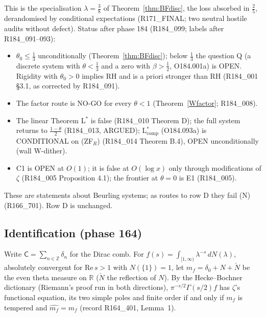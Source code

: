 \documentclass[11pt]{amsart}
\theoremstyle{definition}
\theoremstyle{remark}
\newcommand{\Rel}{\mathrm{Re}\,}
\begin{document}
\noindent This is the specialisation $\lambda=\frac38$ of Theorem~\ref{thm:BFdisc}, the loss absorbed in $\frac25$, derandomised by
conditional expectations (R171\_FINAL; two neutral hostile audits without defect). Status after phase 184 (R184\_099; labels after
R184\_091--093):
\begin{itemize}
\item $\theta_0\le\frac13$ unconditionally (Theorem~\ref{thm:BFdisc}); below $\frac13$ the question Q (a discrete system with $\theta<\frac13$ and a zero with $\beta>\frac12$, O184.001a) is OPEN. Rigidity with $\theta_0>0$ implies RH and is a priori stronger than RH (R184\_001 \S3.1, as corrected by R184\_091).
\item The factor route is NO-GO for every $\theta<1$ (Theorem~\ref{Wfactor}; R184\_008).
\item The linear Theorem L$^*$ is false (R184\_010 Theorem D); the full system returns to $\frac{1-\theta}2$ (R184\_013, ARGUED); L$^*_{\mathrm{comp}}$ (O184.093a) is CONDITIONAL on (ZF$_R$) (R184\_014 Theorem B.4), OPEN unconditionally (wall W-dither).
\item C1 is OPEN at $O(1)$; it is false at $O(\log x)$ only through modifications of $\zeta$ (R184\_005 Proposition 4.1); the frontier at $\theta=0$ is E1 (R184\_005).
\end{itemize}
These are statements about Beurling systems; as routes to row D they fail (N) (R166\_701). Row D is unchanged.

\subsection{Identification (phase 164)}\label{subsec:identification}
Write $\mathsf C=\sum_{n\in\mathbb Z}\delta_n$ for the Dirac comb. For $f(s)=\int_{[1,\infty)}\lambda^{-s}\,dN(\lambda)$,
absolutely convergent for $\Rel s>1$ with $N(\{1\})=1$, let $m_f=\delta_0+N+\check N$ be the even theta measure on $\mathbb R$
($\check N$ the reflection of $N$). By the Hecke--Bochner dictionary (Riemann's proof run in both directions), $\pi^{-s/2}\Gamma(s/2)f$
has $\zeta$'s functional equation, its two simple poles and finite order if and only if $m_f$ is tempered and $\widehat{m_f}=m_f$
(record R164\_401, Lemma~1).
\end{document}
